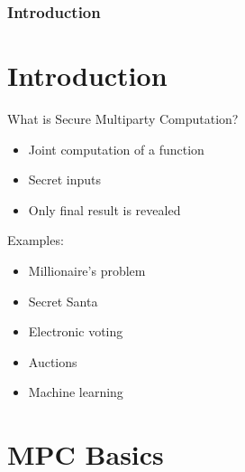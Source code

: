 \section{Introduction}

\hypertarget{introduction}{%
\part{Introduction}\label{introduction}}

What is Secure Multiparty Computation?

\begin{itemize}
\tightlist
\item
  Joint computation of a function
\item
  Secret inputs
\item
  Only final result is revealed
\end{itemize}

Examples:

\begin{itemize}
\tightlist
\item
  Millionaire's problem
\item
  Secret Santa
\item
  Electronic voting
\item
  Auctions
\item
  Machine learning
\end{itemize}

\hypertarget{mpc-basics}{%
\part{MPC Basics}\label{mpc-basics}}

